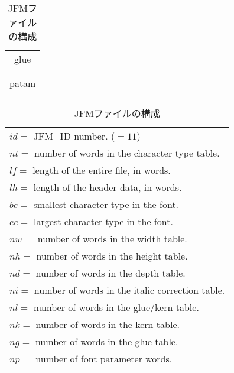 \documentclass[twoside]{jarticle}
\begin{document}
\begin{table}[h]
\begin{minipage}[b]{2in}
\begin{tabular}{|c|c|}
\multicolumn{2}{|c|}{glue} \\
\multicolumn{2}{|c|}{}\\ \hline
\multicolumn{2}{|c|}{}\\
\multicolumn{2}{|c|}{patam} \\
\multicolumn{2}{|c|}{}\\ \hline
\end{tabular}
\end{minipage}
\begin{minipage}[b]{3.3in}
\noindent
\begin{tabular}{l}
$id=$ JFM\_ID number. ($=11$) \\
$nt=$ number of words in the character type table. \\
$lf=$ length of the entire file, in words. \\
$lh=$ length of the header data, in words. \\
$bc=$ smallest character type in the font. \\
$ec=$ largest character type in the font. \\
$nw=$ number of words in the width table. \\
$nh=$ number of words in the height table. \\
$nd=$ number of words in the depth table. \\
$ni=$ number of words in the italic correction table. \\
$nl=$ number of words in the glue/kern table. \\
$nk=$ number of words in the kern table. \\
$ng=$ number of words in the glue table. \\
$np=$ number of font parameter words. \\
\end{tabular}
\end{minipage}
\caption{JFMファイルの構成\label{構成}}
\end{table}
\end{document}
